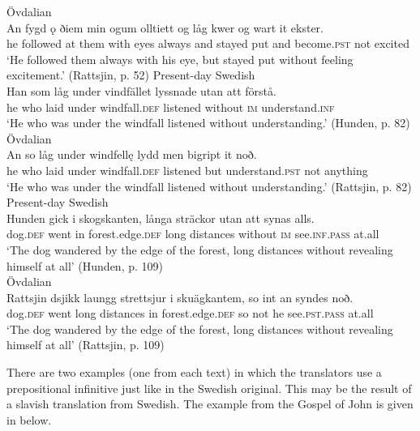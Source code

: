 \documentclass[output=paper]{langscibook}
\begin{document}
\ex Övdalian\label{ex:kalm:23b}\\ 
\gll An fygd ǫ ðiem min ogum olltiett og låg kwer og wart it ekster.\\
he followed at them with eyes always and stayed put and become.\textsc{pst} not excited\\
\glt ‘He followed them always with his eye, but stayed put without feeling excitement.’ (Rattsjin, p. 52)
\z 
\ex
\label{ex:kalm:24}
\ea Present-day Swedish\label{ex:kalm:24a}\\
\gll Han som låg under vindfället lyssnade utan att förstå.\\
he who laid under windfall.\textsc{def} listened without \textsc{im} understand.\textsc{inf}\\
\glt ‘He who was under the windfall listened without understanding.’ (Hunden, p. 82)\\
\ex Övdalian\label{ex:kalm:24b}\\ 
\gll An so låg under windfellę lydd men bigript it noð.\\
he who laid under windfall.\textsc{def} listened but understand.\textsc{pst} not anything\\
\glt ‘He who was under the windfall listened without understanding.’ (Rattsjin, p. 82)
\z 
\ex
\label{ex:kalm:25}
\ea Present-day Swedish\label{ex:kalm:25a}\\
\gll Hunden gick i skogskanten, långa sträckor utan att synas alls.\\
dog.\textsc{def} went in forest.edge.\textsc{def} long distances without \textsc{im} see.\textsc{inf.pass} at.all\\
\glt ‘The dog wandered by the edge of the forest, long distances without revealing himself at all’ (Hunden, p. 109)\\
\ex Övdalian\label{ex:kalm:25b}\\ 
\gll Rattsjin dsjikk laungg strettsjur i skuägkantem, so int an syndes noð.\\
dog.\textsc{def} went long distances in forest.edge.\textsc{def} so not he see.\textsc{pst.pass} at.all\\
\glt ‘The dog wandered by the edge of the forest, long distances without revealing himself at all’ (Rattsjin, p. 109)
\z 
\z 


There are two examples (one from each text) in which the translators use a prepositional infinitive just like in the Swedish original. This may be the result of a slavish translation from Swedish. The example from the Gospel of John is given in  below. 
\end{document}
